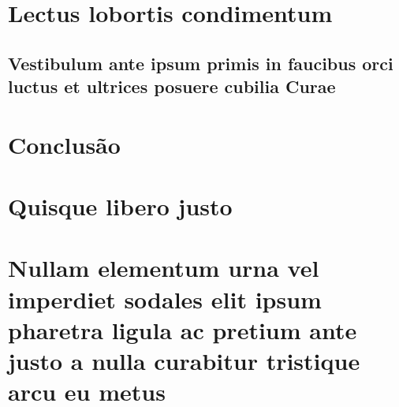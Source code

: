 \documentclass[
	12pt,				%
	twoside,			%
	a4paper,			%
	english,			%
	french,				%
	spanish,			%
	brazil				%
	]{abntex2}
\begin{document}
\chapter{Lectus lobortis condimentum}

\section{Vestibulum ante ipsum primis in faucibus orci luctus et ultrices
posuere cubilia Curae}


\chapter{Conclusão}


\postextual



%
%


\begin{apendicesenv}

\partapendices

\chapter{Quisque libero justo}


\chapter{Nullam elementum urna vel imperdiet sodales elit ipsum pharetra ligula
ac pretium ante justo a nulla curabitur tristique arcu eu metus}

\end{apendicesenv}
\end{document}
